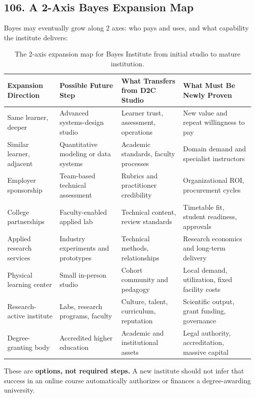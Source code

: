 \subsection*{106. A 2-Axis Bayes Expansion Map}

Bayes may eventually grow along 2 axes: who pays and uses, and what capability the institute delivers:

\begin{table}[t]
\centering
\small
\begin{tabularx}{\textwidth}{l p{4cm} p{4.5cm} X}
\toprule
\textbf{Expansion Direction} & \textbf{Possible Future Step} & \textbf{What Transfers from D2C Studio} & \textbf{What Must Be Newly Proven} \\
\midrule
Same learner, deeper & Advanced systems-design studio & Learner trust, assessment, operations & New value and repeat willingness to pay \\
Similar learner, adjacent & Quantitative modeling or data systems & Academic standards, faculty processes & Domain demand and specialist instructors \\
Employer sponsorship & Team-based technical assessment & Rubrics and practitioner credibility & Organizational ROI, procurement cycles \\
College partnerships & Faculty-enabled applied lab & Technical content, review standards & Timetable fit, student readiness, approvals \\
Applied research services & Industry experiments and prototypes & Technical methods, relationships & Research economics and long-term delivery \\
Physical learning center & Small in-person studio & Cohort community and pedagogy & Local demand, utilization, fixed facility costs \\
Research-active institute & Labs, research programs, faculty & Culture, talent, curriculum, reputation & Scientific output, grant funding, governance \\
Degree-granting body & Accredited higher education & Academic and institutional assets & Legal authority, accreditation, massive capital \\
\bottomrule
\end{tabularx}
\caption{The 2-axis expansion map for Bayes Institute from initial studio to mature institution.}
\label{tab:ch7-bayes-expansion-map}
\end{table}

These are \textbf{options, not required steps.} A new institute should not infer that success in an online course automatically authorizes or finances a degree-awarding university.

